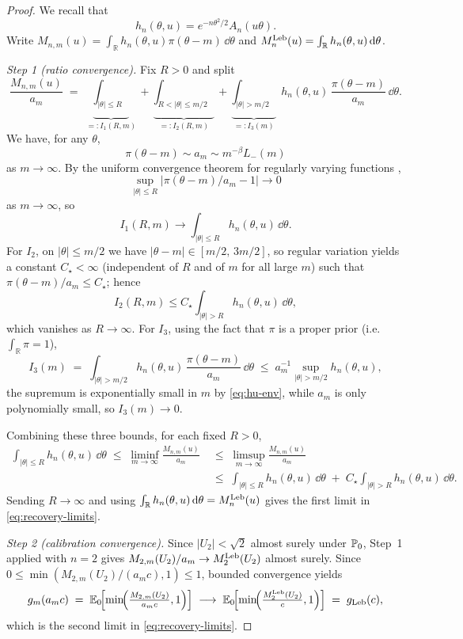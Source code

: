 \documentclass{article}
\begin{document}
\begin{proof}
    We recall that
$$
h_{n}(\theta,u)=e^{-n\theta^2/2 }A_n(u \theta ).
$$
Write $M_{n,m}(u)=\int_{\mathbb R} h_n(\theta,u)\pi(\theta-m)\,\dd\theta$ and $M_n^{\mathrm{Leb}}(u)=\int_{\mathbb R} h_n(\theta,u)\,\mathrm{d}\theta$.

\emph{Step 1 (ratio convergence).}  Fix $R>0$ and split
\[
  \frac{M_{n,m}(u)}{a_m}
  \;=\;\underbrace{\int_{|\theta|\leq R}}_{=:I_1(R,m)}
   +\underbrace{\int_{R<|\theta|\leq m/2}}_{=:I_2(R,m)}
   +\underbrace{\int_{|\theta|>m/2}}_{=:I_3(m)}\;
   h_{n}(\theta,u)\,\frac{\pi(\theta-m)}{a_m}\,\dd\theta.
\]
We have, for any $\theta$,
$$
\pi(\theta-m)\sim a_m \sim m^{-\beta}L_-(m)
$$
as $m\to\infty$. By the uniform convergence theorem for regularly varying functions
\citep[Theorem~1.2.1]{Bingham1987},
$$
\sup_{|\theta|\leq R}|\pi(\theta-m)/a_m-1|\to 0
$$
as $m\to\infty$, so
$$
I_1(R,m)\to\int_{|\theta|\leq R}h_{n}(\theta,u)\,\dd\theta.
$$
For $I_2$, on $|\theta|\leq m/2$ we have $|\theta-m|\in[m/2,\,3m/2]$, so
regular variation yields a constant $C_\star<\infty$ (independent of $R$ and of
$m$ for all large $m$) such that $\pi(\theta-m)/a_m\leq C_\star$; hence
$$
I_2(R,m)\leq C_\star\int_{|\theta|>R}h_{n}(\theta,u)\,\dd\theta,
$$ which vanishes
as $R\to\infty$. For $I_3$, using the fact that $\pi$ is a proper prior
(i.e.\ $\int_\mathbb{R}\pi=1$),
\[
I_3(m)\;=\;\int_{|\theta|>m/2}h_{n}(\theta,u)\,\frac{\pi(\theta-m)}{a_m}\,\dd\theta
   \;\leq\; a_m^{-1}\sup_{|\theta|>m/2}h_{n}(\theta,u),
\]
the supremum is exponentially small in $m$ by \eqref{eq:hu-env}, while $a_m$ is
only polynomially small, so $I_3(m)\to 0$.

Combining these three bounds, for each fixed $R>0$,
\begin{align*}
   \int_{|\theta|\leq R}h_{n}(\theta,u)\,\dd\theta
   \;\leq\; \liminf_{m\to\infty}\frac{M_{n,m}(u)}{a_m}
   &\;\leq\; \limsup_{m\to\infty}\frac{M_{n,m}(u)}{a_m}\\
   & \;\leq\; \int_{|\theta|\leq R}h_{n}(\theta,u)\,\dd\theta
   \;+\; C_\star\!\int_{|\theta|>R}h_{n}(\theta,u)\,\dd\theta.
\end{align*}
Sending $R\to\infty$ and using $\int_\mathbb{R} h_{n}(\theta,u)\,\mathrm{d}\theta
= M_n^{\mathrm{Leb}}(u)$ gives the first limit in
\eqref{eq:recovery-limits}.

\emph{Step 2 (calibration convergence).}
Since \(|U_2|<\sqrt 2\) almost surely under \(\mathbb{P}_0\), Step~1 applied with \(n=2\) gives
\(M_{2,m}(U_2)/a_m\to M_2^{\mathrm{Leb}}(U_2)\) almost surely. Since \(0\leq\min(M_{2,m}(U_2)/(a_m c),1)\leq 1\), bounded convergence yields
\[
  g_m(a_m c)
  \;=\;\mathbb{E}_0\!\Bigl[\min\!\Bigl(\tfrac{M_{2,m}(U_2)}{a_mc},1\Bigr)\Bigr]
  \;\longrightarrow\;
  \mathbb{E}_0\!\Bigl[\min\!\Bigl(\tfrac{M_2^{\mathrm{Leb}}(U_2)}{c},1\Bigr)\Bigr]
  \;=\;g_{\mathrm{Leb}}(c),
\]
which is the second limit in \eqref{eq:recovery-limits}.


\end{proof}
\end{document}
